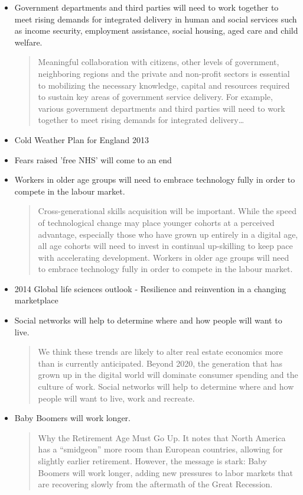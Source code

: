 \begin{itemize}
\item Government departments and third parties will need to work together to meet rising demands for integrated delivery in human and social services such as income security, employment assistance, social housing, aged care and child welfare.
\begin{quotation}
Meaningful collaboration with citizens, other levels of government, neighboring regions and the private and non-profit sectors is essential to mobilizing the necessary knowledge, capital and resources required to sustain key areas of government service delivery. For example, various government departments and third parties will need to work together to meet rising demands for integrated delivery\ldots\end{quotation}
\item Cold Weather Plan  for England 2013
\item Fears raised 'free NHS' will come to an end
\item Workers in older age groups will need to embrace technology fully in order to compete in the labour market.
\begin{quotation}
Cross-generational skills acquisition will be important. While the speed of technological change may place younger cohorts at a perceived advantage, especially those who have grown up entirely in a digital age, all age cohorts will need to invest in continual up-skilling to keep pace with accelerating development. Workers in older age groups will need to embrace technology fully in order to compete in the labour market.\end{quotation}
\item 2014 Global life sciences outlook - Resilience and reinvention in a changing marketplace
\item Social networks will help to determine where and how people will want to live.
\begin{quotation}
We think these trends are likely to alter real estate economics more than is currently anticipated. Beyond 2020, the generation that has grown up in the digital world will dominate consumer spending and the culture of work. Social networks will help to determine where and how people will want to live, work and recreate.\end{quotation}
\item Baby Boomers will work longer.
\begin{quotation}
Why the Retirement Age Must Go Up. It notes that North America has a ``smidgeon'' more room than European countries, allowing for slightly earlier retirement. However, the message is stark: Baby Boomers will work longer, adding new pressures to labor markets that are recovering slowly from the aftermath of the Great Recession.\end{quotation}

\end{itemize}
